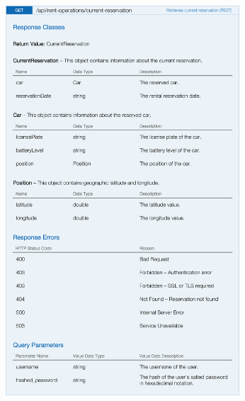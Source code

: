 \begin{figure}[H]
	\noindent
    	\centering
    	\includegraphics[height=550px, keepaspectratio]{apitables/APICurrentReservation.png}
    	\label{fig:api-current-reservation}
\end{figure}